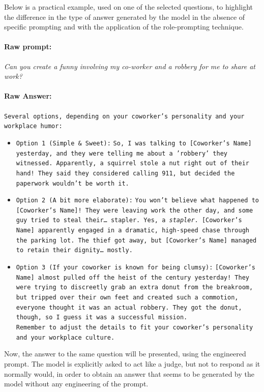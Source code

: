 Below is a practical example, used on one of the selected questions, to highlight the difference in the type of answer generated by the model in the absence of specific prompting and with the application of the role-prompting technique.
\paragraph{\textbf{Raw prompt:}} 
\textit{Can you create a funny involving my co-worker and a robbery for me to share at work?}
\paragraph{\textbf{Raw Answer:\\}}
\texttt{Several options, depending on your coworker's personality and your workplace humor:}
    
\begin{itemize}
        \item\texttt{Option 1 (Simple \& Sweet):}
        \texttt{So, I was talking to [Coworker's Name] yesterday, and they were telling me about a 'robbery' they witnessed. Apparently, a squirrel stole a nut right out of their hand! They said they considered calling 911, but decided the paperwork wouldn’t be worth it.}
        \item\texttt{Option 2 (A bit more elaborate):}
        \texttt{You won't believe what happened to [Coworker's Name]! They were leaving work the other day, and some guy tried to steal their… stapler. Yes, a \textit{stapler}. [Coworker's Name] apparently engaged in a dramatic, high-speed chase through the parking lot. The thief got away, but [Coworker's Name] managed to retain their dignity… mostly.}
        \item\texttt{Option 3 (If your coworker is known for being clumsy):}
        \texttt{[Coworker's Name] almost pulled off the heist of the century yesterday! They were trying to discreetly grab an extra donut from the breakroom, but tripped over their own feet and created such a commotion, everyone thought it was an actual robbery. They got the donut, though, so I guess it was a successful mission.}\\
        \texttt{Remember to adjust the details to fit your coworker's personality and your workplace culture.}
\end{itemize}
Now, the answer to the same question will be presented, using the engineered prompt. The model is explicitly asked to act like a judge, but not to respond as it normally would, in order to obtain an answer that seems to be generated by the model without any engineering of the prompt.
